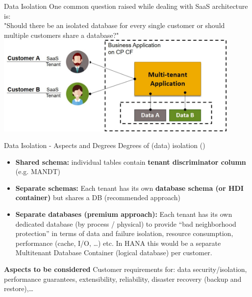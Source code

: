 \begin{frame}[t,fragile]{Data Isolation}
\small
One common question raised while dealing with SaaS architecture is:\\"Should there be an isolated database for every single customer or should multiple customers share a database?"
\vfill
\includegraphics[width=0.9\textwidth]{../MultiTenancy/images/DataIsolation}
\end{frame}

\begin{frame}[t,fragile]{Data Isolation - Aspects and Degrees}
\small
Degrees of (data) isolation ()
\vfill
\begin{itemize}
\item \textbf{Shared schema:} individual tables contain \textbf{tenant discriminator column}
\\(e.g. MANDT) 
\item \textbf{Separate schemas:} Each tenant has its own \textbf{database schema (or HDI container)} but shares a DB (recommended approach)
\item \textbf{Separate databases (premium approach):} Each tenant has its own dedicated database (by process / physical) to provide “bad neighborhood protection” in terms of data and failure isolation, resource consumption, performance (cache, I/O, …) etc. In HANA this would be a separate Multitenant Database Container (logical database) per customer.
\end{itemize}
\vfill
\textbf{Aspects to be considered}
Customer requirements for: data security/isolation, performance guarantees, extensibility, reliability, disaster recovery (backup and restore),\ldots
\end{frame}


